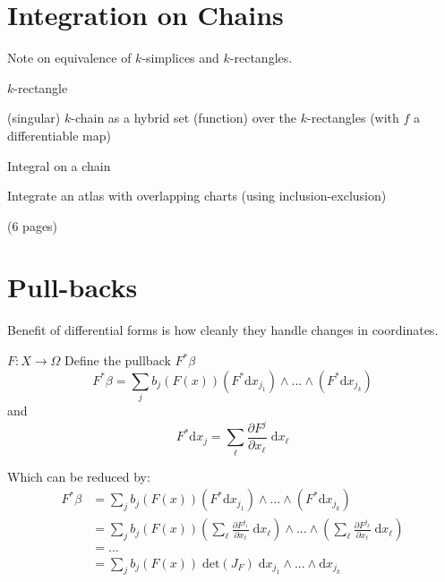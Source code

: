 %
%

\section{Integration on Chains}

Note on equivalence of $k$-simplices and $k$-rectangles.

\begin{definition}
$k$-rectangle
\end{definition}

\begin{definition}
(singular) $k$-chain as a hybrid set (function) over the $k$-rectangles (with $f$ a differentiable map)
\end{definition}

\begin{definition}
Integral on a chain
\end{definition}

\begin{example}
Integrate an atlas with overlapping charts (using inclusion-exclusion)
\end{example}

(6 pages)

\newpage \addtocounter{page}{5}



%
%

\section{Pull-backs}

Benefit of differential forms is how cleanly they handle changes in coordinates.

\begin{definition}
$F: X \to \Omega$
Define the pullback $F^* \beta$
\begin{equation}
F^* \beta = \sum_j  b_j ( F(x)) (F^* \text{d}x_{j_1}) \wedge ... \wedge (F^* \text{d} x_{j_k})
\end{equation}
and
\begin{equation}
F^* \text{d}x_j = \sum_\ell \frac{\partial F^j}{\partial x_\ell} \; \text{d} x_\ell
\end{equation}
\end{definition}

Which can be reduced by:
\begin{align}
F^ * \beta & = \sum_j  b_j ( F(x)) (F^* \text{d}x_{j_1}) \wedge ... \wedge (F^* \text{d} x_{j_k}) \\
& = \sum_j  b_j ( F(x))  
\left( \sum_\ell \frac{\partial F^{j_1}}{\partial x_\ell} \; \text{d} x_\ell \right)
\wedge ... \wedge  
\left( \sum_\ell \frac{\partial F^{j_k}}{\partial x_\ell} \; \text{d} x_\ell \right) \\
& = ... \\
& = \sum_j b_j ( F(x)) \; \text{det}\left( J_F \right) \; \text{d}x_{j_1} \wedge ... \wedge \text{d} x_{j_k}
\end{align}

